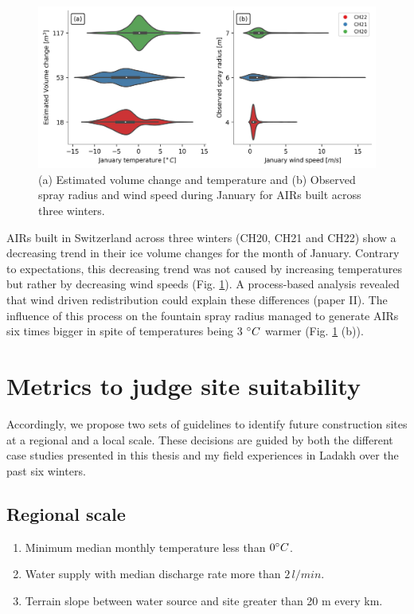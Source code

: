 \begin{figure}[htb]
\centering
\includegraphics[width=\textwidth]{figs/CH_diffs.jpg}
\caption{(a) Estimated volume change and temperature and (b) Observed spray radius and wind speed
during January for \ac{AIRs} built across three winters. } 
\label{fig:CH_diffs}
\end{figure}

\ac{AIRs} built in Switzerland across three winters (CH20, CH21 and CH22) show a decreasing trend in their ice volume
changes for the month of January. Contrary to expectations, this decreasing trend was not caused by increasing
temperatures but rather by decreasing wind speeds (Fig. \ref{fig:CH_diffs}). A process-based analysis revealed
that wind driven redistribution could explain these differences (paper II). The influence of this process on
the fountain spray radius managed to generate \ac{AIRs} six times bigger in spite of temperatures being 3 $^{\circ} C$
warmer (Fig. \ref{fig:CH_diffs} (b)). 



\section{Metrics to judge site suitability}

Accordingly, we propose two sets of guidelines to identify future construction sites at a regional and a local
scale. These decisions are guided by both the different case studies presented in this thesis and my field
experiences in Ladakh over the past six winters.

\subsection{Regional scale}

\begin{enumerate}

  \item Minimum median monthly temperature less than $0 ^{\circ} C$. 
  \item Water supply with median discharge rate more than $2\, l/min$.
  \item Terrain slope between water source and site greater than 20 m every km. 

\end{enumerate}


